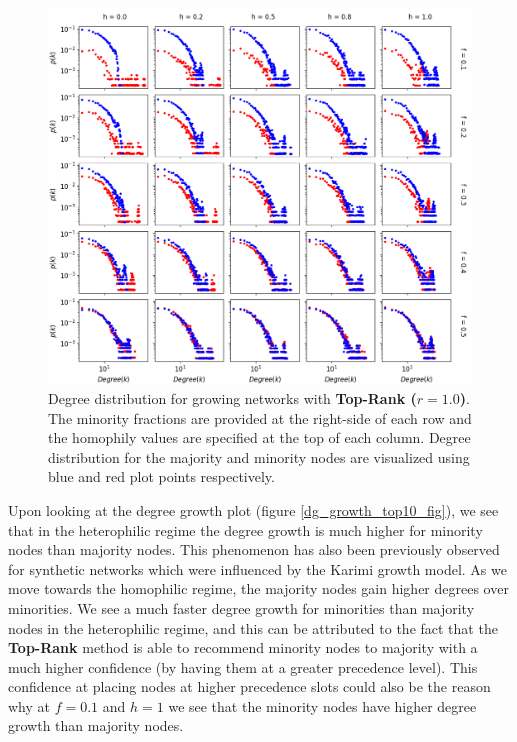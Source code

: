\begin{figure}[h!]
	\centering
	\includegraphics[width=1.0\textwidth]{images/dd_growth_top10.png}
	\caption{Degree distribution for growing networks with \textbf{Top-Rank ($r = 1.0$)}. The minority fractions are provided at the right-side of each row and the homophily values are specified at the top of each column. Degree distribution for the majority and minority nodes are visualized using blue and red plot points respectively.}
	\label{dd_growth_top10_fig}
\end{figure}

Upon looking at the degree growth plot (figure \ref{dg_growth_top10_fig}), we see that in the heterophilic regime the degree growth is much higher for minority nodes than majority nodes. This phenomenon has also been previously observed for synthetic networks which were influenced by the Karimi growth model. As we move towards the homophilic regime, the majority nodes gain higher degrees over minorities. We see a much faster degree growth for minorities than majority nodes in the heterophilic regime, and this can be attributed to the fact that the \textbf{Top-Rank} method is able to recommend minority nodes to majority with a much higher confidence (by having them at a greater precedence level). This confidence at placing nodes at higher precedence slots could also be the reason why at $f=0.1$ and $h=1$ we see that the minority nodes have higher degree growth than majority nodes.

